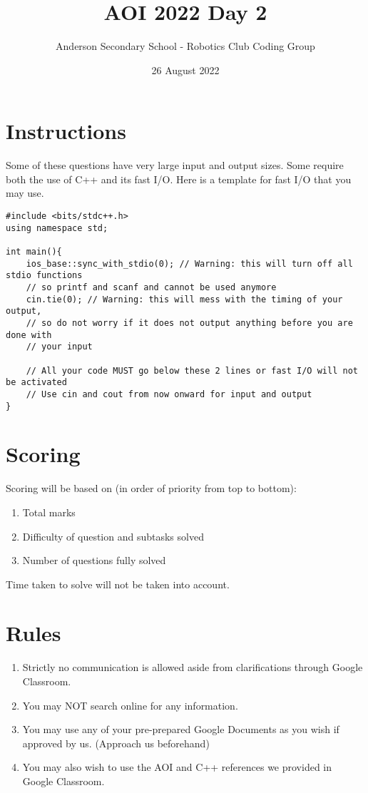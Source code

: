 \documentclass{report}
\title{AOI 2022 Day 2}
\author{Anderson Secondary School - Robotics Club Coding Group}
\date{26 August 2022}
\begin{document}
\setlength{\parindent}{0pt}

\maketitle

\hfill \break \hfill \break

\section*{Instructions}
Some of these questions have very large input and output sizes. Some require both the use of C++ and its fast I/O. Here is a template for fast I/O that you may use.

\begin{verbatim}
#include <bits/stdc++.h>
using namespace std;

int main(){
    ios_base::sync_with_stdio(0); // Warning: this will turn off all stdio functions
    // so printf and scanf and cannot be used anymore
    cin.tie(0); // Warning: this will mess with the timing of your output, 
    // so do not worry if it does not output anything before you are done with
    // your input
    
    // All your code MUST go below these 2 lines or fast I/O will not be activated
    // Use cin and cout from now onward for input and output
}
\end{verbatim}

\section*{Scoring}
Scoring will be based on (in order of priority from top to bottom):
\begin{enumerate}
    \item Total marks
    \item Difficulty of question and subtasks solved
    \item Number of questions fully solved
\end{enumerate}

Time taken to solve will not be taken into account.

\section*{Rules}
\begin{enumerate}
    \item Strictly no communication is allowed aside from clarifications through Google Classroom.
    \item You may NOT search online for any information.
    \item You may use any of your pre-prepared Google Documents as you wish if approved by us. (Approach us beforehand)
    \item You may also wish to use the AOI and C++ references we provided in Google Classroom.
\end{enumerate}
\end{document}
